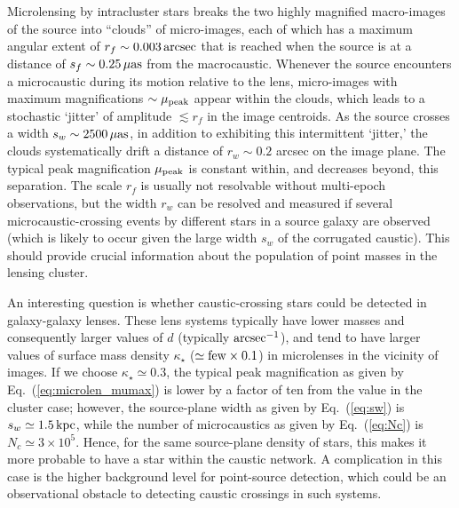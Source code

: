 \documentclass{aastex6}
\newcommand{\refeq}[1]{Eq.~(\ref{eq:#1})}
\begin{document}
Microlensing by intracluster stars breaks the two highly magnified macro-images of the source into ``clouds'' of micro-images, each of which has a maximum angular extent of $r_f \sim 0.003\, {\rm arcsec}$ that is reached when the source is at a distance of $s_f \sim 0.25 \, \mu{\rm as}$ from the macrocaustic. Whenever the source encounters a microcaustic during its motion relative to the lens, micro-images with maximum magnifications $\sim \mu_{\rm peak}$ appear within the clouds, which leads to a stochastic `jitter' of amplitude $\lesssim r_f$ in the image centroids. As the source crosses a width $s_w \sim 2500 \, \mu{\rm as}$, in addition to exhibiting this intermittent `jitter,' the clouds systematically drift a distance of $r_w \sim 0.2$ arcsec on the image plane. The typical peak magnification $\mu_{\rm peak}$ is constant within, and decreases beyond, this separation. The scale $r_f$ is usually not resolvable without multi-epoch observations, but the width $r_w$ can be resolved and measured if several microcaustic-crossing events by different stars in a source galaxy are observed (which is likely to occur given the large width $s_w$ of the corrugated caustic). This should provide crucial information about the population of point masses in the lensing cluster.

An interesting question is whether caustic-crossing stars could be detected in galaxy-galaxy lenses. These lens systems typically have lower masses and consequently larger values of $d$ (typically ${\rm arcsec}^{-1}$), and tend to have larger values of surface mass density $\kappa_\star$ ($\simeq {\rm few} \times 0.1$) in microlenses in the vicinity of images. If we choose $\kappa_\star \simeq 0.3$, the typical peak magnification as given by \refeq{microlen_mumax} is lower by a factor of ten from the value in the cluster case; however, the source-plane width as given by \refeq{sw} is $s_w \simeq 1.5 \, {\rm kpc}$, while the number of microcaustics as given by \refeq{Nc} is $N_c \simeq 3 \times 10^5$. Hence, for the same source-plane density of stars, this makes it more probable to have a star within the caustic network. A complication in this case is the higher background level for point-source detection, which could be an observational obstacle to detecting caustic crossings in such systems.
\end{document}
